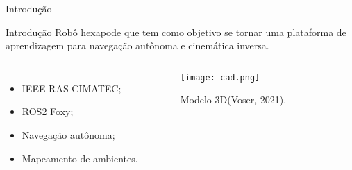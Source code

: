 \begin{frame}[c]{Introdução} 
    \transdissolve[duration=0.5]
   
    \begin{center}
    \end{center}
    
\end{frame}

\begin{frame}[t]{Introdução} 
    \transdissolve[duration=0.5]
    Robô hexapode que tem como objetivo se tornar uma plataforma de aprendizagem para navegação autônoma e cinemática inversa.
        \begin{columns}[t]
                \begin{itemize}
                    \item IEEE RAS CIMATEC;
                    \item ROS2 Foxy;
                    \item Navegação autônoma;
                    \item Mapeamento de ambientes.
                \end{itemize}
            \begin{center}
                \begin{figure}
                    \texttt{[image: cad.png]}
                    \caption{Modelo 3D(Voser, 2021).}
                \end{figure}
            \end{center}
        \end{columns}
\end{frame}

